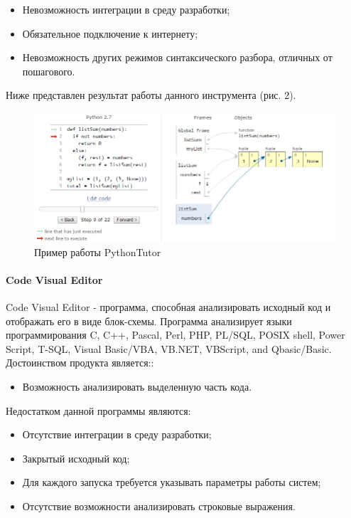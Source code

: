 \documentclass{matmex-diploma}
\begin{document}
\begin{itemize}

        \item { Невозможность интеграции в среду разработки; }
        \item { Обязательное подключение к интернету; }
        \item { Невозможность других режимов синтаксического разбора, отличных от пошагового. }
        
 \end{itemize}

Ниже представлен результат работы данного инструмента (рис. 2).
\begin{figure}[h]
\label{Python}
\centering
\includegraphics{PythonTutor.PNG}
\caption{Пример работы PythonTutor}
\end{figure}


\paragraph {Code Visual Editor}
Code Visual Editor - программа, способная анализировать исходный код и отображать его в виде блок-схемы. Программа анализирует языки программирования C, C++, Pascal, Perl, PHP, PL/SQL, POSIX shell, Power Script, T-SQL, Visual Basic/VBA, VB.NET, VBScript, and Qbasic/Basic.   \\
Достоинством продукта является::

\begin{itemize}

        \item { Возможность анализировать выделенную часть кода. }
        
 \end{itemize}
Недостатком данной программы являются:

\begin{itemize}

        \item { Отсутствие интеграции в среду разработки; }
        \item { Закрытый исходный код; }
        \item { Для каждого запуска требуется указывать параметры работы систем; }
        \item { Отсутствие возможности анализировать строковые выражения. }
        
 \end{itemize}
\end{document}
